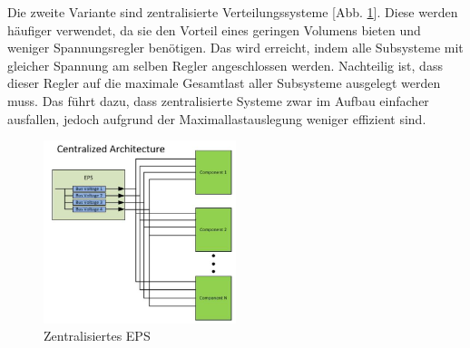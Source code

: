  Die zweite Variante sind zentralisierte Verteilungssysteme [Abb. \ref{c_eps}]. Diese werden häufiger verwendet, da sie den Vorteil eines geringen Volumens bieten und weniger Spannungsregler benötigen. Das wird erreicht, indem alle Subsysteme mit gleicher Spannung am selben Regler angeschlossen werden. Nachteilig ist, dass dieser Regler auf die maximale Gesamtlast aller Subsysteme ausgelegt werden muss. Das führt dazu, dass zentralisierte Systeme zwar im Aufbau einfacher ausfallen, jedoch aufgrund der Maximallastauslegung weniger effizient sind.\cite{Abaker.2017}
\begin{figure}[H]
	\centering
		\includegraphics[width=0.50\textwidth]{./graphics/Centralized_EPS.PNG}
	\caption{Zentralisiertes EPS \cite{Burt.2011}}
	\label{c_eps}
\end{figure}



